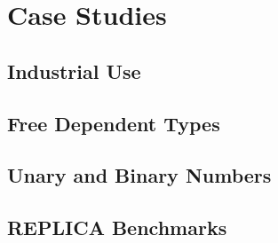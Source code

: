 \section{Case Studies}
\label{sec:case}

\subsection{Industrial Use}

\subsection{Free Dependent Types}

\subsection{Unary and Binary Numbers}

\subsection{REPLICA Benchmarks}
